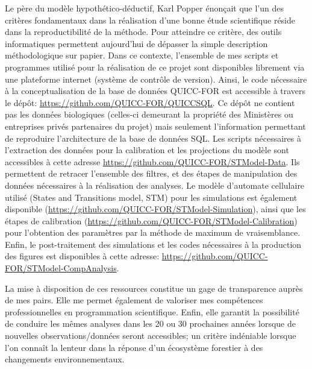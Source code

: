 Le père du modèle hypothético-déductif, Karl Popper énonçait que l'un des critères fondamentaux dans
la réalisation d'une bonne étude scientifique réside dans la reproductibilité de la méthode. Pour
atteindre ce critère, des outils informatiques permettent aujourd'hui de dépasser la simple
description méthodologique sur papier. Dans ce contexte, l'ensemble de mes scripts et programmes
utilisé pour la réalisation de ce projet sont disponibles librement via une plateforme internet (système de contrôle de version).
Ainsi, le code nécessaire à la conceptualisation de la base de données QUICC-FOR est accessible à
travers le dépôt: \url{https://github.com/QUICC-FOR/QUICCSQL}. Ce dépôt ne contient pas les données
biologiques (celles-ci demeurant la propriété des Ministères ou entreprises privés partenaires du
projet) mais seulement l'information permettant de reproduire l'architecture de la base de données
SQL. Les scripts nécessaires à l'extraction des données pour la calibration et les projections du
modèle sont accessibles à cette adresse \url{https://github.com/QUICC-FOR/STModel-Data}. Ils
permettent de retracer l'ensemble des filtres, et des étapes de manipulation des données nécessaires à
la réalisation des analyses. Le modèle d'automate cellulaire utilisé (States and Transitions model,
STM) pour les simulations est également disponible
(\url{https://github.com/QUICC-FOR/STModel-Simulation}), ainsi que les étapes de calibration
(\url{https://github.com/QUICC-FOR/STModel-Calibration}) pour l'obtention des paramètres par la
méthode de maximum de vraisemblance. Enfin, le post-traitement des simulations et les codes
nécessaires à la production des figures est disponibles à cette adresse:
\url{https://github.com/QUICC-FOR/STModel-CompAnalysis}. 

La mise à disposition de ces ressources
constitue un gage de transparence auprès de mes pairs. Elle me permet également de valoriser mes
compétences professionnelles en programmation scientifique. Enfin, elle garantit la possibilité de
conduire les mêmes analyses dans les 20 ou 30 prochaines années lorsque de nouvelles
observations/données seront accessibles; un critère indéniable lorsque l'on connaît la lenteur dans
la réponse d'un écosystème forestier à des changements environnementaux.




